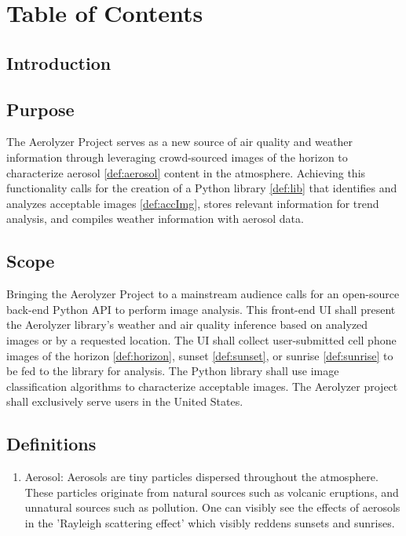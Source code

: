 \documentclass[journal,10pt,draftclsnofoot,onecolumn]{IEEEtran}
\begin{document}
\section{Table of Contents}
\tableofcontents
\clearpage

\begin{singlespace}

\section{Introduction}

	\subsection{Purpose}
		The Aerolyzer Project serves as a new source of air quality and weather information through leveraging crowd-sourced images of the horizon to characterize aerosol \ref{def:aerosol} content in the atmosphere.
		Achieving this functionality calls for the creation of a Python library \ref{def:lib} that identifies and analyzes acceptable images \ref{def:accImg}, stores relevant information for trend analysis, and compiles weather information with aerosol data. 

	\subsection{Scope}
		Bringing the Aerolyzer Project to a mainstream audience calls for an open-source back-end Python API to perform image analysis.
		This front-end UI shall present the Aerolyzer library's weather and air quality inference based on analyzed images or by a requested location.
		The UI shall collect user-submitted cell phone images of the horizon \ref{def:horizon}, sunset \ref{def:sunset}, or sunrise \ref{def:sunrise} to be fed to the library for analysis.
		The Python library shall use image classification algorithms to characterize acceptable images.
		The Aerolyzer project shall exclusively serve users in the United States.

	\subsection{Definitions}
		\begin{enumerate}
			\item \label{def:aerosol} Aerosol: Aerosols are tiny particles dispersed throughout the atmosphere.
			These particles originate from natural sources such as volcanic eruptions, and unnatural sources such as pollution. 
			One can visibly see the effects of aerosols in the 'Rayleigh scattering effect' which visibly reddens sunsets and sunrises. \\


\end{enumerate}
\end{singlespace}
\end{document}

